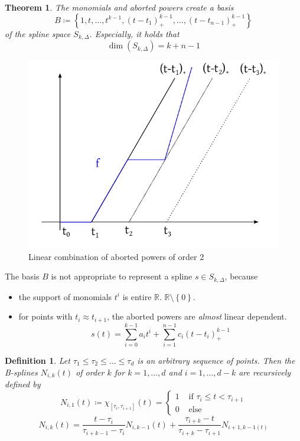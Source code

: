\documentclass[a4paper]{article}
\newcounter{lecref}[section]
\numberwithin{lecref}{section}
\theoremstyle{break}
\newtheorem*{Thm}{Theorem}
\newtheorem{definition}[lecref]{Definition}
\newcommand{\Set}[1]{\left\{#1\right\}}
\begin{document}
\begin{Thm}
  \label{theorem:4-20}
  The monomials and aborted powers create a basis
  \[ B \coloneqq \Set{1, t, \dots, t^{k-1}, (t - t_1)_+^{k-1}, \dots, (t - t_{n-1})_+^{k-1}} \]
  of the spline space $S_{k,\Delta}$. Especially, it holds that
  \[ \dim(S_{k,\Delta}) = k + n - 1 \]
\end{Thm}

\begin{figure}[ht]
  \begin{center}
    \includegraphics{img/splines.pdf}
    \caption{Linear combination of aborted powers of order 2}
    \label{img:splines}
  \end{center}
\end{figure}

The basis $B$ is not appropriate to represent a spline $s \in S_{k,\Delta}$, because
\begin{itemize}
  \item the support of monomials $t^i$ is entire $\mathbb R$. $\mathbb R \setminus \Set{0}$.
  \item for points with $t_i \approx t_{i+1}$, the aborted powers are \emph{almost} linear dependent.
    \[ s(t) = \sum_{i=0}^{k-1} a_i t^i + \sum_{i=1}^{n-1} c_i (t - t_i)_+^{k-1} \]
\end{itemize}

\begin{definition}
  \label{definition:4-21}
  Let $\tau_1 \leq \tau_2 \leq \dots \leq \tau_d$ is an arbitrary sequence of points.
  Then the B-splines $N_{i,k}(t)$ of order $k$ for $k = 1, \dots, d$ and $i = 1, \dots, d-k$
  are recursively defined by
  \[
    N_{i,1}(t) \coloneqq \chi_{[\tau_i,\tau_{i+1}]}(t) = \begin{cases}
      1 & \text{ if } \tau_i \leq t < \tau_{i+1} \\
      0 & \text{ else}
    \end{cases}
  \] \[
    N_{i,k}(t) = \frac{t - \tau_i}{\tau_{i+k-1} - \tau_i} N_{i,k-1}(t) + \frac{\tau_{i+k} - t}{\tau_{i+k} - \tau_{i+1}} N_{i+1,k-1(t)}
  \]
\end{definition}
\end{document}
